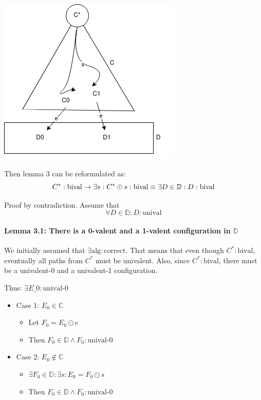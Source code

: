 \includegraphics{images/flp_sets_c_d.png}


Then lemma 3 can be reformulated as: \[
C^*:\text{bival} \to \exists s: C^* \odot s: \text{bival} \\
\equiv \exists D \in \mathbb{D}: D:\text{bival}
\]

Proof by contradiction. Assume that \[
\forall D \in \mathbb{D}: D:\text{unival}
\]

\hypertarget{lemma-3.1-there-is-a-0-valent-and-a-1-valent-configuration-in-mathbbd}{%
\paragraph{\texorpdfstring{Lemma 3.1: There is a 0-valent and a 1-valent
configuration in
\(\mathbb{D}\)}{Lemma 3.1: There is a 0-valent and a 1-valent configuration in \textbackslash mathbb\{D\}}}\label{lemma-3.1-there-is-a-0-valent-and-a-1-valent-configuration-in-mathbbd}}

We initially assumed that \(\exists \text{alg}: \text{correct}\). That
means that even though \(C^*:\text{bival}\), eventually all paths from
\(C^*\) must be univalent. Also, since \(C^*:\text{bival}\), there must
be a univalent-0 and a univalent-1 configuration.

Thus: $ \exists E\_0: \text{unival-0} $

\begin{itemize}
 
\item
  Case 1: \(E_0 \in \mathbb{C}\)

  \begin{itemize}
   
  \item
    Let \(F_0 = E_0 \odot e\)
  \item
    Then \(F_0 \in \mathbb{D} \land F_0:\text{unival-0}\)
  \end{itemize}
\item
  Case 2: \(E_0 \notin \mathbb{C}\)

  \begin{itemize}
   
  \item
    \(\exists F_0 \in \mathbb{D}: \exists s: E_0 = F_0 \odot s\)
  \item
    Then \(F_0 \in \mathbb{D} \land F_0:\text{unival-0}\)
  \end{itemize}
\end{itemize}


